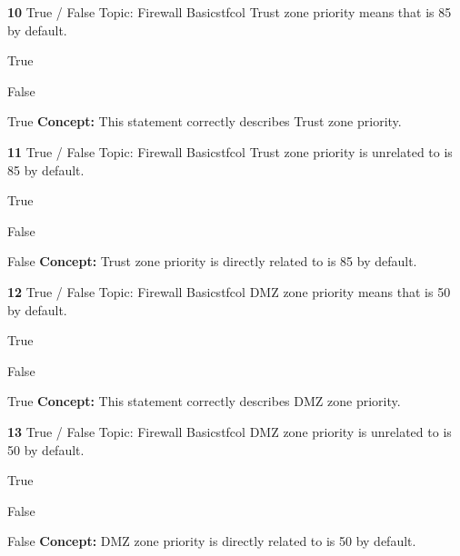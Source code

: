 \documentclass[10pt,a4paper]{article}
\begin{document}
\begin{qcard}{\color{white}\textbf{10} \hfill \small True / False \textbar{} Topic: Firewall Basics}{tfcol}
Trust zone priority means that is 85 by default.

\begin{qoptions}
\item True
\item False
\end{qoptions}
\begin{explainbox}{True}
\textbf{Concept:} This statement correctly describes Trust zone priority.
\end{explainbox}
\end{qcard}

\begin{qcard}{\color{white}\textbf{11} \hfill \small True / False \textbar{} Topic: Firewall Basics}{tfcol}
Trust zone priority is unrelated to is 85 by default.

\begin{qoptions}
\item True
\item False
\end{qoptions}
\begin{explainbox}{False}
\textbf{Concept:} Trust zone priority is directly related to is 85 by default.
\end{explainbox}
\end{qcard}

\begin{qcard}{\color{white}\textbf{12} \hfill \small True / False \textbar{} Topic: Firewall Basics}{tfcol}
DMZ zone priority means that is 50 by default.

\begin{qoptions}
\item True
\item False
\end{qoptions}
\begin{explainbox}{True}
\textbf{Concept:} This statement correctly describes DMZ zone priority.
\end{explainbox}
\end{qcard}

\begin{qcard}{\color{white}\textbf{13} \hfill \small True / False \textbar{} Topic: Firewall Basics}{tfcol}
DMZ zone priority is unrelated to is 50 by default.

\begin{qoptions}
\item True
\item False
\end{qoptions}
\begin{explainbox}{False}
\textbf{Concept:} DMZ zone priority is directly related to is 50 by default.
\end{explainbox}
\end{qcard}
\end{document}
